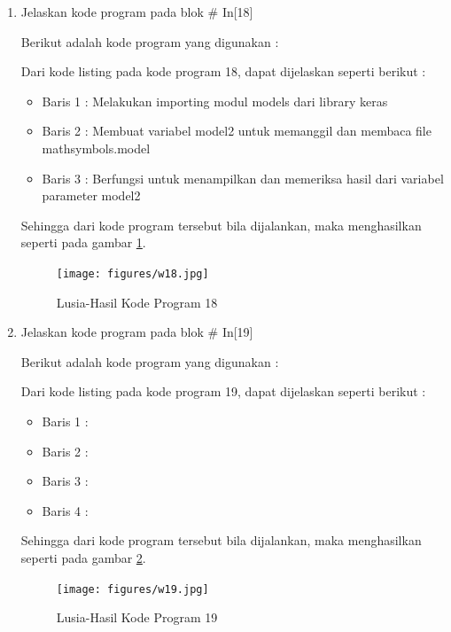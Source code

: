 \begin{enumerate}
\item Jelaskan kode program pada blok \# In[18]
	\par Berikut adalah kode program yang digunakan :
	
	\par Dari kode listing pada kode program 18, dapat dijelaskan seperti berikut :
	\begin{itemize}
	\item Baris 1	: Melakukan importing modul models dari library keras
	\item Baris 2	: Membuat variabel model2 untuk memanggil dan membaca file mathsymbols.model
	\item Baris 3	: Berfungsi untuk menampilkan dan memeriksa hasil dari variabel parameter model2
	\end{itemize}
	\par Sehingga dari kode program tersebut bila dijalankan, maka menghasilkan seperti pada gambar \ref{7B18}.
		\begin{figure}[!hbtp]
		\centering
		\texttt{[image: figures/w18.jpg]}
		\caption{Lusia-Hasil Kode Program 18}
		\label{7B18}
		\end{figure}

\item Jelaskan kode program pada blok \# In[19]
	\par Berikut adalah kode program yang digunakan :
	
	\par Dari kode listing pada kode program 19, dapat dijelaskan seperti berikut :
	\begin{itemize}
	\item Baris 1	: 
	\item Baris 2	: 
	\item Baris 3	: 
	\item Baris 4	: 
	\end{itemize}
	\par Sehingga dari kode program tersebut bila dijalankan, maka menghasilkan seperti pada gambar \ref{7B19}.
		\begin{figure}[!hbtp]
		\centering
		\texttt{[image: figures/w19.jpg]}
		\caption{Lusia-Hasil Kode Program 19}
		\label{7B19}
		\end{figure}
		

\end{enumerate}
